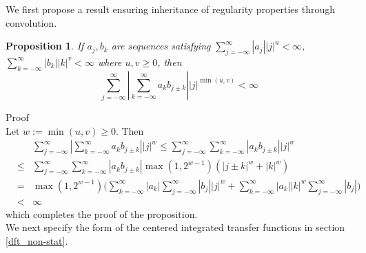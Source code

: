 \documentclass[11pt]{article}
\newtheorem{Proposition}{Proposition}
\begin{document}
\begin{appendix}
We first propose a result ensuring inheritance of regularity properties
through convolution.
\begin{Proposition}\label{propabs}
If \(a_j,b_k\) are sequences satisfying
\(\sum_{j=-\infty}^{\infty}|a_j||j|^u<\infty\),
\(\sum_{k=-\infty}^{\infty}|b_k||k|^v<\infty\) where \(u,v\geq 0\),
then
\[\sum_{j=-\infty}^{\infty}\left|\sum_{k=-\infty}^{\infty}a_kb_{j\pm k}\right||j|^{\min(u,v)}<\infty\]
\end{Proposition}

Proof\\

Let \(w:=\min(u,v)\geq 0\). Then
\begin{eqnarray*}
&&\sum_{j=-\infty}^{\infty}\left|\sum_{k=-\infty}^{\infty}a_kb_{j\pm
k}\right||j|^w\leq
\sum_{j=-\infty}^\infty\sum_{k=-\infty}^{\infty}\left|a_kb_{j\pm k}\right||j|^w\\
&\leq&\sum_{j=-\infty}^\infty\sum_{k=-\infty}^{\infty}\left|a_kb_{j\pm  k}\right|\max(1,2^{w-1})(|j\pm k|^w+|k|^w)\\
&=&\max(1,2^{w-1})\Bigg(\sum_{k=-\infty}^\infty|a_k|\sum_{j=-\infty}^\infty|b_{j}||j|^w
+\sum_{k=-\infty}^\infty|a_k||k|^w\sum_{j=-\infty}^\infty|b_{j}|\Bigg)\\
&<&\infty
\end{eqnarray*}
which completes the proof of the proposition.\\

We next specify the form of the centered integrated transfer functions in section \ref{dft_non-stat}.


\end{appendix}
\end{document}
